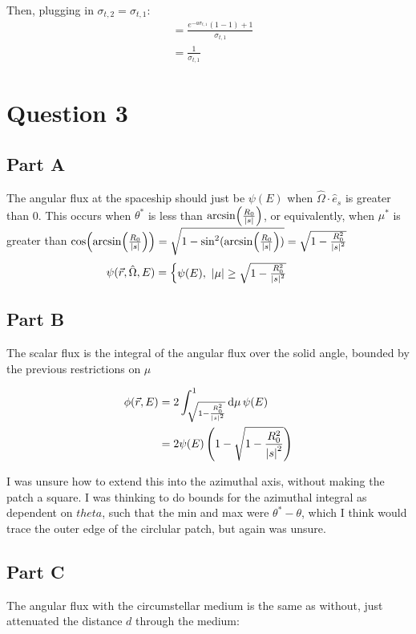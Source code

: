 \documentclass{article}
\begin{document}
Then, plugging in $\sigma_{t,2}=\sigma_{t,1}$:
\begin{align*}
  &= \frac{e^{-a\sigma_{t,1}}\left(1-1\right)+1}{\sigma_{t,1}}\\
  &= \frac{1}{\sigma_{t,1}}
\end{align*}

\clearpage
\section{Question 3}
\subsection{Part A}
The angular flux at the spaceship should just be $\psi(E)$ when $\hat{\Omega}\cdot\hat{e}_s$ is greater than 0. This occurs when $\theta^*$ is less than $\arcsin(\frac{R_0}{\abs{s}})$, or equivalently, when $\mu^*$ is greater than $\cos(\arcsin(\frac{R_0}{\abs{s}}))=\sqrt{1-\sin^2(\arcsin(\frac{R_0}{\abs{s}}))}=\sqrt{1-\frac{R_0^2}{\abs{s}^2}}$
\begin{align}
  \psi(\vec{r},\hat{\Omega}, E) &= 
    \begin{cases}
        \psi(E),\ \abs{\mu} \geq \sqrt{1-\frac{R_0^2}{\abs{s}^2}}
    \end{cases}
\end{align}

\subsection{Part B}
The scalar flux is the integral of the angular flux over the solid angle, bounded by the previous restrictions on $\mu$

\begin{align*}
  \phi(\vec{r}, E) &= 2\int_{\sqrt{1-\frac{R_0^2}{\abs{s}^2}}}^1\dd{\mu}\psi(E)\\
  &= 2\psi(E)\left(1 - \sqrt{1-\frac{R_0^2}{\abs{s}^2}}\right) 
\end{align*}

I was unsure how to extend this into the azimuthal axis, without making the patch a square. I was thinking to do bounds for the azimuthal integral as dependent on $theta$, such that the min and max were $\theta^* - \theta$, which I think would trace the outer edge of the circlular patch, but again was unsure. 

\subsection{Part C}
The angular flux with the circumstellar medium is the same as without, just attenuated the distance $d$ through the medium:
\end{document}
